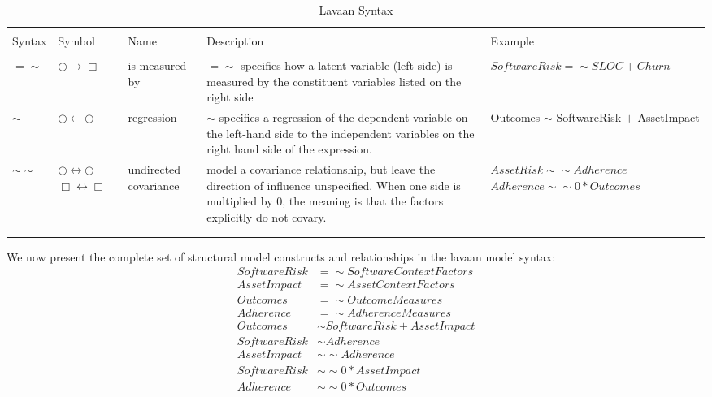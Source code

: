 \begin{table}[!htbp] \centering 
	\caption{Lavaan Syntax} 
	\label{tab:model_lavaan_syntax} 
	\begin{small}
		\begin{tabular}{p{.75cm}p{1.25cm}p{1.5cm}p{3.5cm}p{2.5cm}} 
			&&&&\\[-1.8ex]\hline 
			\hline&&&& \\[-1.8ex] 
			Syntax & Symbol & Name & Description & Example \\ 
			\hline &&&&\\[-1.8ex]  
			$=\sim$	& $\bigcirc \rightarrow \Box$ & is measured by & $=\sim$ specifies how a latent variable (left side) is measured by the constituent variables listed on the right side & $SoftwareRisk =\sim SLOC + Churn$\\	
			 $\sim$ & $\bigcirc \leftarrow \bigcirc$ & regression & $\sim$ specifies a regression of the dependent variable on the left-hand side to the independent variables on the right hand side of the expression. & Outcomes $\sim$ SoftwareRisk $+$ AssetImpact  \\	
			 $\sim\sim$ & $\bigcirc \leftrightarrow \bigcirc$ $\Box \leftrightarrow \Box$ & undirected covariance & model a covariance relationship, but leave the direction of influence unspecified. When one side is multiplied by 0, the meaning is that the factors  explicitly do not covary. & $AssetRisk \sim\sim Adherence$  $Adherence \sim\sim 0*Outcomes$\\
			\hline &&&&\\[-1.8ex] 
			\hline &&&&\\[-1.8ex] 
		\end{tabular} 
	\end{small}
\end{table} 
We now present the complete set of structural model constructs and relationships in the lavaan model syntax: 
 \begin{equation} \label{eq:1}
 \begin{split}
 SoftwareRisk &=\sim SoftwareContextFactors\\ 
  AssetImpact &=\sim AssetContextFactors\\
  Outcomes &=\sim OutcomeMeasures\\
  Adherence &=\sim AdherenceMeasures\\
  Outcomes &\sim SoftwareRisk + AssetImpact\\
   SoftwareRisk &\sim Adherence\\
   AssetImpact &\sim\sim  Adherence\\
   SoftwareRisk &\sim\sim 0*AssetImpact\\
   Adherence &\sim\sim 0*Outcomes\\
 \end{split}
 \end{equation}     

